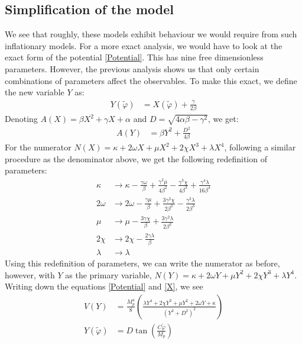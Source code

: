 \documentclass[aps,prd,reprint,preprintnumbers,showpacs,floatfix,nofootinbib,superscript address]{revtex4-2}
\begin{document}
\subsection{Simplification of the model} \label{Reduction of parameters}
We see that roughly, these models exhibit behaviour we would require from such inflationary models. For a more exact analysis, we would have to look at the exact form of the potential \cref{Potential}. This has nine free dimensionless parameters. However, the previous analysis shows us that only certain combinations of parameters affect the observables. To make this exact, we define the new variable $Y$ as:
\begin{align}
    Y(\tilde{\varphi}) &= X(\tilde{\varphi}) + \frac{\gamma}{2\beta}
\end{align}
Denoting $A(X) = \beta X^2 + \gamma X + \alpha$ and $D = \sqrt{4\alpha\beta-\gamma^2}$, we get:
\begin{align}
    A(Y) &= \beta Y^2 + \frac{D^2}{4\beta} \nonumber
\end{align}
For the numerator $N(X) = \kappa + 2\omega X +\mu X^2 + 2\chi X^3 + \lambda X^4$, following a similar procedure as the denominator above, we get the following redefinition of parameters: 
\begin{align}
    \kappa &\rightarrow \kappa - \frac{\gamma\omega}{\beta} + \frac{\gamma^2\mu}{4\beta^2} - \frac{\gamma^3\chi}{4\beta^3} +\frac{\gamma^4\lambda}{16\beta^4}    \nonumber \\
    2\omega &\rightarrow 2\omega - \frac{\gamma\mu}{\beta} + \frac{3\gamma^2\chi}{2\beta^2} - \frac{\gamma^3\lambda}{2\beta^3}   \nonumber \\
    \mu &\rightarrow \mu - \frac{3\gamma\chi}{\beta} + \frac{3\gamma^2\lambda}{2\beta^2} \nonumber \\
    2\chi &\rightarrow 2\chi - \frac{2\gamma\lambda}{\beta} \nonumber \\
    \lambda &\rightarrow \lambda \label{huge redefiniton}
\end{align}
Using this redefinition of parameters, we can write the numerator as before, however, with $Y$ as the primary variable, $N(Y) = \kappa + 2\omega Y +\mu Y^2 + 2\chi Y^3 + \lambda Y^4$. Writing down the equations \cref{Potential} and \cref{X}, we see
\begin{align}
    V(Y) &= \frac{M_p^4}{8} \left(\frac{\lambda Y^4 + 2 \chi Y^3 + \mu Y^2  + 2\omega Y + \kappa}{(Y^2 + D^2)^2} \right) \nonumber \\
    Y(\tilde{\varphi}) &= D \tan \left(\frac{C \tilde{\varphi}}{M_p} \right) \nonumber
\end{align}
\end{document}
